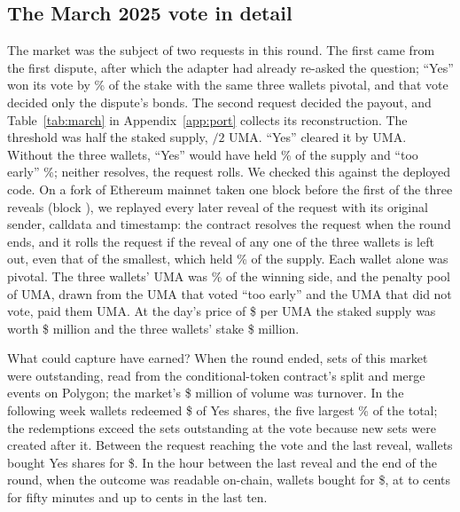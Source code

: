 \documentclass[conference,compsoc]{IEEEtran}
\begin{document}
\subsection{The March 2025 vote in detail}
\label{sec:march}
The market was the subject of two requests in this round. The first came from the first dispute, after which the adapter had already re-asked the question; ``Yes'' won its vote by \marchFirstMarginPct\% of the stake with the same three wallets pivotal, and that vote decided only the dispute's bonds. The second request decided the payout, and Table~\ref{tab:march} in Appendix~\ref{app:port} collects its reconstruction. The threshold was half the staked supply, \marchStake{}$/2$ UMA. ``Yes'' cleared it by \marchMargin{} UMA. Without the three wallets, ``Yes'' would have held \marchYesMinusWhalePct\% of the supply and ``too early'' \marchTooEarlyPct\%; neither resolves, the request rolls. We checked this against the deployed code. On a fork of Ethereum mainnet taken one block before the first of the three reveals (block \forkReplayBlock), we replayed every later reveal of the request with its original sender, calldata and timestamp: the contract resolves the request when the round ends, and it rolls the request if the reveal of any one of the three wallets is left out, even that of the smallest, which held \marchWalletCPct\% of the supply. Each wallet alone was pivotal. The three wallets' \marchWhale{} UMA was \marchWhaleShareOfWinners\% of the winning side, and the penalty pool of \marchPool{} UMA, drawn from the \marchTooEarly{} UMA that voted ``too early'' and the \marchAbstain{} UMA that did not vote, paid them \marchWhaleGain{} UMA. At the day's price of \$\umaPriceMarch{} per UMA the staked supply was worth \$\marchStakeUsdM{} million and the three wallets' stake \$\marchWhaleUsdM{} million.

What could capture have earned? When the round ended, \marchOI{} sets of this market were outstanding, read from the conditional-token contract's split and merge events on Polygon; the market's \$\marchVolumeM{} million of volume was turnover. In the following week \marchRedeemers{} wallets redeemed \$\marchRedeemed{} of Yes shares, the five largest \marchTopFiveSharePct\% of the total; the redemptions exceed the sets outstanding at the vote because new sets were created after it. Between the request reaching the vote and the last reveal, \marchDisputeBuyWallets{} wallets bought \marchDisputeBuyShares{} Yes shares for \$\marchDisputeBuyCost{}. In the hour between the last reveal and the end of the round, when the outcome was readable on-chain, \marchPostRevealWallets{} wallets bought \marchPostRevealShares{} for \$\marchPostRevealCost{}, at \marchPostRevealLowCents{} to \marchPostRevealHighCents{} cents for fifty minutes and up to \marchPostRevealMaxCents{} cents in the last ten.
\end{document}
